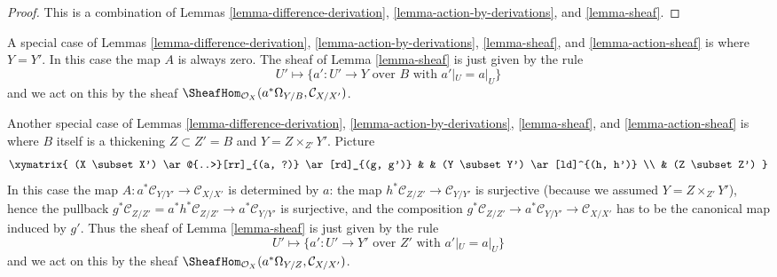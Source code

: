 \begin{proof}
This is a combination of
Lemmas \ref{lemma-difference-derivation},
\ref{lemma-action-by-derivations},
and \ref{lemma-sheaf}.
\end{proof}

\begin{remark}
\label{remark-special-case}
A special case of
Lemmas \ref{lemma-difference-derivation},
\ref{lemma-action-by-derivations},
\ref{lemma-sheaf}, and
\ref{lemma-action-sheaf}
is where $Y = Y'$. In this case the map $A$ is always zero.
The sheaf of
Lemma \ref{lemma-sheaf}
is just given by the rule
$$
U' \mapsto
\{a' : U' \to Y\text{ over }B\text{ with } a'|_U = a|_U\}
$$
and we act on this by the sheaf
$\SheafHom_{\mathcal{O}_X}(a^*\Omega_{Y/B}, \mathcal{C}_{X/X'})$.
\end{remark}

\begin{remark}
\label{remark-another-special-case}
Another special case of
Lemmas \ref{lemma-difference-derivation},
\ref{lemma-action-by-derivations},
\ref{lemma-sheaf}, and
\ref{lemma-action-sheaf}
is where $B$ itself is a thickening $Z \subset Z' = B$
and $Y = Z \times_{Z'} Y'$. Picture
$$
\xymatrix{
(X \subset X') \ar@{..>}[rr]_{(a, ?)} \ar[rd]_{(g, g')} & &
(Y \subset Y') \ar[ld]^{(h, h')} \\
& (Z \subset Z')
}
$$
In this case the map $A : a^*\mathcal{C}_{Y/Y'} \to \mathcal{C}_{X/X'}$
is determined by $a$: the map
$h^*\mathcal{C}_{Z/Z'} \to \mathcal{C}_{Y/Y'}$ is surjective (because we
assumed $Y = Z \times_{Z'} Y'$), hence the pullback
$g^*\mathcal{C}_{Z/Z'} = a^*h^*\mathcal{C}_{Z/Z'} \to
a^*\mathcal{C}_{Y/Y'}$ is surjective, and the composition
$g^*\mathcal{C}_{Z/Z'} \to a^*\mathcal{C}_{Y/Y'} \to \mathcal{C}_{X/X'}$
has to be the canonical map induced by $g'$. Thus the sheaf of
Lemma \ref{lemma-sheaf}
is just given by the rule
$$
U' \mapsto
\{a' : U' \to Y'\text{ over }Z'\text{ with } a'|_U = a|_U\}
$$
and we act on this by the sheaf
$\SheafHom_{\mathcal{O}_X}(a^*\Omega_{Y/Z}, \mathcal{C}_{X/X'})$.
\end{remark}

